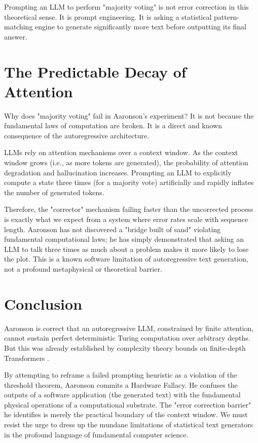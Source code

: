 \documentclass[12pt,a4paper]{article}
\begin{document}
Prompting an LLM to perform "majority voting" is not error correction in this theoretical sense. It is prompt engineering. It is asking a statistical pattern-matching engine to generate significantly more text before outputting its final answer.

\section{The Predictable Decay of Attention}

Why does "majority voting" fail in Aaronson's experiment? It is not because the fundamental laws of computation are broken. It is a direct and known consequence of the autoregressive architecture.

LLMs rely on attention mechanisms over a context window. As the context window grows (i.e., as more tokens are generated), the probability of attention degradation and hallucination increases. Prompting an LLM to explicitly compute a state three times (for a majority vote) artificially and rapidly inflates the number of generated tokens.

Therefore, the "corrector" mechanism failing faster than the uncorrected process is exactly what we expect from a system where error rates scale with sequence length. Aaronson has not discovered a "bridge built of sand" violating fundamental computational laws; he has simply demonstrated that asking an LLM to talk three times as much about a problem makes it more likely to lose the plot. This is a known software limitation of autoregressive text generation, not a profound metaphysical or theoretical barrier.

\section{Conclusion}

Aaronson is correct that an autoregressive LLM, constrained by finite attention, cannot sustain perfect deterministic Turing computation over arbitrary depths. But this was already established by complexity theory bounds on finite-depth Transformers \citep{hossenfelder2026_complexity}.

By attempting to reframe a failed prompting heuristic as a violation of the threshold theorem, Aaronson commits a Hardware Fallacy. He confuses the outputs of a software application (the generated text) with the fundamental physical operations of a computational substrate. The "error correction barrier" he identifies is merely the practical boundary of the context window. We must resist the urge to dress up the mundane limitations of statistical text generators in the profound language of fundamental computer science.
\end{document}
